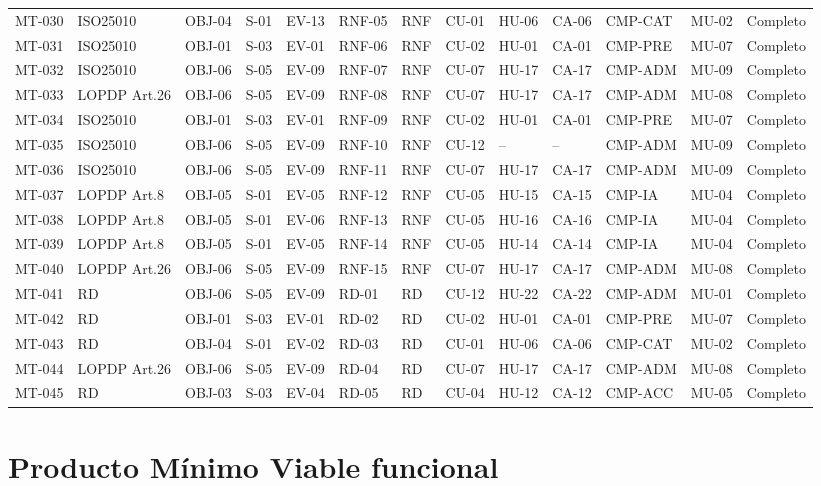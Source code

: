 \documentclass[12pt,journal,onecolumn]{IEEEtran}
\begin{document}
\begin{landscape}
\begin{longtable}{P{0.9cm}P{1.5cm}P{0.8cm}P{0.8cm}P{1.3cm}P{0.9cm}P{0.7cm}P{0.8cm}P{0.8cm}P{0.8cm}P{1.1cm}P{0.9cm}P{1.0cm}}
MT-030 & ISO25010 & OBJ-04 & S-01 & EV-13 & RNF-05 & RNF & CU-01 & HU-06 & CA-06 & CMP-CAT & MU-02 & Completo\\
MT-031 & ISO25010 & OBJ-01 & S-03 & EV-01 & RNF-06 & RNF & CU-02 & HU-01 & CA-01 & CMP-PRE & MU-07 & Completo\\
MT-032 & ISO25010 & OBJ-06 & S-05 & EV-09 & RNF-07 & RNF & CU-07 & HU-17 & CA-17 & CMP-ADM & MU-09 & Completo\\
MT-033 & LOPDP Art.26 & OBJ-06 & S-05 & EV-09 & RNF-08 & RNF & CU-07 & HU-17 & CA-17 & CMP-ADM & MU-08 & Completo\\
MT-034 & ISO25010 & OBJ-01 & S-03 & EV-01 & RNF-09 & RNF & CU-02 & HU-01 & CA-01 & CMP-PRE & MU-07 & Completo\\
MT-035 & ISO25010 & OBJ-06 & S-05 & EV-09 & RNF-10 & RNF & CU-12 & -- & -- & CMP-ADM & MU-09 & Completo\\
MT-036 & ISO25010 & OBJ-06 & S-05 & EV-09 & RNF-11 & RNF & CU-07 & HU-17 & CA-17 & CMP-ADM & MU-09 & Completo\\
MT-037 & LOPDP Art.8 & OBJ-05 & S-01 & EV-05 & RNF-12 & RNF & CU-05 & HU-15 & CA-15 & CMP-IA & MU-04 & Completo\\
MT-038 & LOPDP Art.8 & OBJ-05 & S-01 & EV-06 & RNF-13 & RNF & CU-05 & HU-16 & CA-16 & CMP-IA & MU-04 & Completo\\
MT-039 & LOPDP Art.8 & OBJ-05 & S-01 & EV-05 & RNF-14 & RNF & CU-05 & HU-14 & CA-14 & CMP-IA & MU-04 & Completo\\
MT-040 & LOPDP Art.26 & OBJ-06 & S-05 & EV-09 & RNF-15 & RNF & CU-07 & HU-17 & CA-17 & CMP-ADM & MU-08 & Completo\\
MT-041 & RD & OBJ-06 & S-05 & EV-09 & RD-01 & RD & CU-12 & HU-22 & CA-22 & CMP-ADM & MU-01 & Completo\\
MT-042 & RD & OBJ-01 & S-03 & EV-01 & RD-02 & RD & CU-02 & HU-01 & CA-01 & CMP-PRE & MU-07 & Completo\\
MT-043 & RD & OBJ-04 & S-01 & EV-02 & RD-03 & RD & CU-01 & HU-06 & CA-06 & CMP-CAT & MU-02 & Completo\\
MT-044 & LOPDP Art.26 & OBJ-06 & S-05 & EV-09 & RD-04 & RD & CU-07 & HU-17 & CA-17 & CMP-ADM & MU-08 & Completo\\
MT-045 & RD & OBJ-03 & S-03 & EV-04 & RD-05 & RD & CU-04 & HU-12 & CA-12 & CMP-ACC & MU-05 & Completo\\
\bottomrule
\end{longtable}
\normalsize
\end{landscape}

\section{Producto Mínimo Viable funcional}
\end{document}
